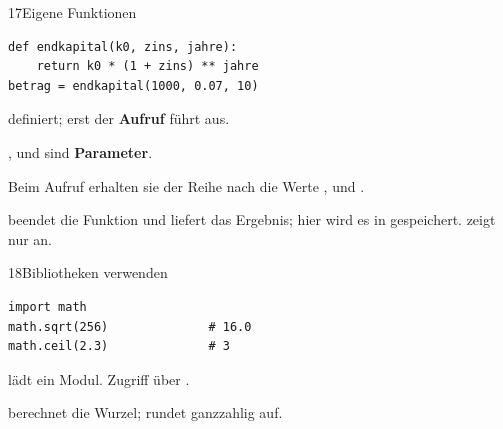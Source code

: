 \vfill
\begin{karte}{17\enspace Eigene Funktionen}
\begin{lstlisting}
def endkapital(k0, zins, jahre):
    return k0 * (1 + zins) ** jahre
betrag = endkapital(1000, 0.07, 10)
\end{lstlisting}
 definiert; erst der \textbf{Aufruf} führt aus.\par {},  und  sind \textbf{Parameter}.\par Beim Aufruf erhalten sie der Reihe nach die Werte ,  und .\par {} beendet die Funktion und liefert das Ergebnis; hier wird es in  gespeichert.  zeigt nur an.
\end{karte}
\vfill
\begin{karte}{18\enspace Bibliotheken verwenden}
\begin{lstlisting}
import math
math.sqrt(256)              # 16.0
math.ceil(2.3)              # 3
\end{lstlisting}
 lädt ein Modul. Zugriff über .\par {} berechnet die Wurzel;  rundet ganzzahlig auf.
\end{karte}
